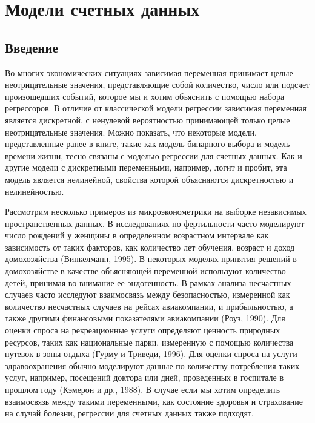 

\chapter{ Модели счетных данных}


\section{Введение}\label{sec:20.1}

\noindent
Во многих экономических ситуациях зависимая переменная принимает целые неотрицательные значения, представляющие собой количество, число или подсчет произошедших событий, которое мы и хотим объяснить с помощью набора регрессоров. В отличие от классической модели регрессии зависимая переменная является дискретной, с ненулевой вероятностью принимающей только целые неотрицательные значения. Можно показать, что некоторые модели, представленные ранее в книге, такие как модель бинарного выбора и модель времени жизни, тесно связаны с моделью регрессии для счетных данных. Как и другие модели с дискретными переменными, например, логит и пробит, эта модель является нелинейной, свойства которой объясняются дискретностью и нелинейностью.

Рассмотрим несколько примеров из микроэконометрики на выборке независимых пространственных данных. В исследованиях по фертильности часто моделируют число рождений у женщины в определенном возрастном интервале как зависимость от таких факторов, как количество лет обучения, возраст и доход домохозяйства (Винкелманн, 1995). В некоторых моделях принятия решений в домохозяйстве в качестве объясняющей переменной используют количество детей, принимая во внимание ее эндогенность. В рамках анализа несчастных случаев часто исследуют взаимосвязь между безопасностью, измеренной как количество несчастных случаев на рейсах авиакомпании, и прибыльностью, а также другими финансовыми показателями авиакомпании (Роуз, 1990). Для оценки спроса на рекреационные услуги определяют ценность природных ресурсов, таких как национальные парки, измеренную с помощью количества путевок в зоны отдыха (Гурму и Триведи, 1996). Для оценки спроса на услуги здравоохранения обычно моделируют данные по количеству потребления таких услуг, например, посещений доктора или дней, проведенных в госпитале в прошлом году (Кэмерон и др., 1988). В случае если мы хотим определить взаимосвязь между такими переменными, как состояние здоровья и страхование на случай болезни, регрессии для счетных данных также подходят.

